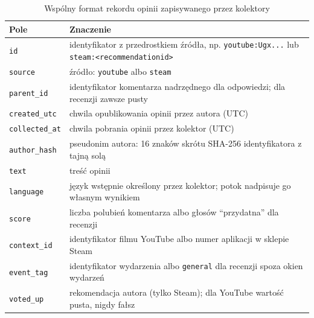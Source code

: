 \begin{table}[hbp]
  \caption{Wspólny format rekordu opinii zapisywanego przez kolektory}
  \label{tab:record-schema}
  \centering
  \small
  \begin{tabular}{|l|p{}|}
    \hline
    Pole                    & Znaczenie                                                                                               \\
    \hline
    \texttt{id}             & identyfikator z przedrostkiem źródła, np. \texttt{youtube:Ugx...} lub \texttt{steam:<recommendationid>} \\
    \hline
    \texttt{source}         & źródło: \texttt{youtube} albo \texttt{steam}                                                           \\
    \hline
    \texttt{parent\_id}     & identyfikator komentarza nadrzędnego dla odpowiedzi; dla recenzji zawsze pusty                         \\
    \hline
    \texttt{created\_utc}   & chwila opublikowania opinii przez autora (UTC)                                                          \\
    \hline
    \texttt{collected\_at}  & chwila pobrania opinii przez kolektor (UTC)                                                             \\
    \hline
    \texttt{author\_hash}   & pseudonim autora: 16 znaków skrótu SHA-256 identyfikatora z tajną solą                                  \\
    \hline
    \texttt{text}           & treść opinii                                                                                            \\
    \hline
    \texttt{language}       & język wstępnie określony przez kolektor; potok nadpisuje go własnym wynikiem                            \\
    \hline
    \texttt{score}          & liczba polubień komentarza albo głosów \enquote{przydatna} dla recenzji                                 \\
    \hline
    \texttt{context\_id}    & identyfikator filmu YouTube albo numer aplikacji w sklepie Steam                                        \\
    \hline
    \texttt{event\_tag}     & identyfikator wydarzenia albo \texttt{general} dla recenzji spoza okien wydarzeń                        \\
    \hline
    \texttt{voted\_up}      & rekomendacja autora (tylko Steam); dla YouTube wartość pusta, nigdy fałsz                               \\
    \hline
  \end{tabular}
\end{table}

